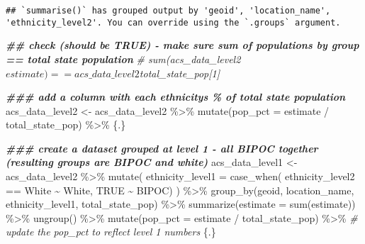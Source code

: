 \documentclass[
]{article}
\newenvironment{Shaded}{\begin{snugshade}}{\end{snugshade}}
\newcommand{\AttributeTok}[1]{\textcolor[rgb]{0.77,0.63,0.00}{#1}}
\newcommand{\CommentTok}[1]{\textcolor[rgb]{0.56,0.35,0.01}{\textit{#1}}}
\newcommand{\ConstantTok}[1]{\textcolor[rgb]{0.00,0.00,0.00}{#1}}
\newcommand{\DocumentationTok}[1]{\textcolor[rgb]{0.56,0.35,0.01}{\textbf{\textit{#1}}}}
\newcommand{\FunctionTok}[1]{\textcolor[rgb]{0.00,0.00,0.00}{#1}}
\newcommand{\NormalTok}[1]{#1}
\newcommand{\OtherTok}[1]{\textcolor[rgb]{0.56,0.35,0.01}{#1}}
\newcommand{\SpecialCharTok}[1]{\textcolor[rgb]{0.00,0.00,0.00}{#1}}
\newcommand{\StringTok}[1]{\textcolor[rgb]{0.31,0.60,0.02}{#1}}
\begin{document}
\begin{verbatim}
## `summarise()` has grouped output by 'geoid', 'location_name', 'ethnicity_level2'. You can override using the `.groups` argument.
\end{verbatim}

\begin{Shaded}
\begin{Highlighting}[]
    \DocumentationTok{\#\# check (should be TRUE) {-} make sure sum of populations by group == total state population}
    \CommentTok{\# sum(acs\_data\_level2$estimate) == acs\_data\_level2$total\_state\_pop[1]}
    
\DocumentationTok{\#\#\# add a column with each ethnicity\textquotesingle{}s \% of total state population}
\NormalTok{acs\_data\_level2 }\OtherTok{\textless{}{-}}\NormalTok{ acs\_data\_level2 }\SpecialCharTok{\%\textgreater{}\%} 
    \FunctionTok{mutate}\NormalTok{(}\AttributeTok{pop\_pct =}\NormalTok{ estimate }\SpecialCharTok{/}\NormalTok{ total\_state\_pop) }\SpecialCharTok{\%\textgreater{}\%} 
\NormalTok{    \{.\}}

\DocumentationTok{\#\#\# create a dataset grouped at level 1 {-} all BIPOC together (resulting groups are BIPOC and white)}
\NormalTok{acs\_data\_level1 }\OtherTok{\textless{}{-}}\NormalTok{ acs\_data\_level2 }\SpecialCharTok{\%\textgreater{}\%}  
    \FunctionTok{mutate}\NormalTok{(}
        \AttributeTok{ethnicity\_level1 =} \FunctionTok{case\_when}\NormalTok{(}
\NormalTok{            ethnicity\_level2 }\SpecialCharTok{==} \StringTok{\textquotesingle{}White\textquotesingle{}} \SpecialCharTok{\textasciitilde{}} \StringTok{\textquotesingle{}White\textquotesingle{}}\NormalTok{, }
            \ConstantTok{TRUE} \SpecialCharTok{\textasciitilde{}} \StringTok{\textquotesingle{}BIPOC\textquotesingle{}}\NormalTok{)}
\NormalTok{    ) }\SpecialCharTok{\%\textgreater{}\%} 
    \FunctionTok{group\_by}\NormalTok{(geoid, location\_name, ethnicity\_level1, total\_state\_pop) }\SpecialCharTok{\%\textgreater{}\%} 
    \FunctionTok{summarize}\NormalTok{(}\AttributeTok{estimate =} \FunctionTok{sum}\NormalTok{(estimate)) }\SpecialCharTok{\%\textgreater{}\%} 
    \FunctionTok{ungroup}\NormalTok{() }\SpecialCharTok{\%\textgreater{}\%} 
    \FunctionTok{mutate}\NormalTok{(}\AttributeTok{pop\_pct =}\NormalTok{ estimate }\SpecialCharTok{/}\NormalTok{ total\_state\_pop) }\SpecialCharTok{\%\textgreater{}\%} \CommentTok{\# update the pop\_pct to reflect level 1 numbers}
\NormalTok{    \{.\}}
\end{Highlighting}
\end{Shaded}
\end{document}

